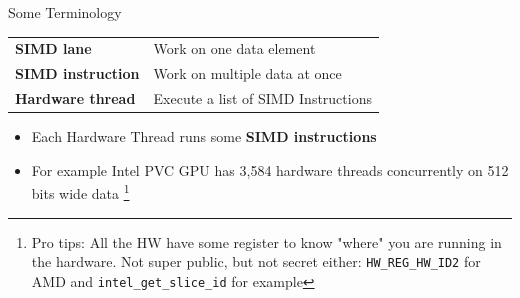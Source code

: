 \begin{frame}{Some Terminology}

\begin{center}
\begin{tabular}{@{}ll@{}}
\toprule
\textbf{SIMD lane}        & Work on one data element \\
\textbf{SIMD instruction} & Work on multiple data at once \\
\textbf{Hardware thread}  & Execute a list of SIMD Instructions \\
\bottomrule
\end{tabular}
\end{center}

\begin{itemize}
    \item Each Hardware Thread runs some \textbf{SIMD instructions}
    \item For example Intel PVC GPU has 3{,}584 hardware threads concurrently on 512 bits wide data \footnote{Pro tips: All the HW have some register to know "where" you are running in the hardware. Not super public, but not secret either: \texttt{HW\_REG\_HW\_ID2} for AMD and \texttt{intel\_get\_slice\_id} for example}
\end{itemize}

\end{frame}

